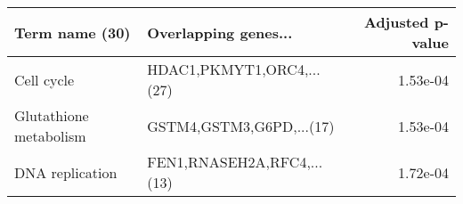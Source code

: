 \begin{tabular}{llr}
\toprule
        Term name (30) &       Overlapping genes... &  Adjusted p-value \\
\midrule
            Cell cycle &  HDAC1,PKMYT1,ORC4,...(27) &          1.53e-04 \\
Glutathione metabolism &   GSTM4,GSTM3,G6PD,...(17) &          1.53e-04 \\
       DNA replication & FEN1,RNASEH2A,RFC4,...(13) &          1.72e-04 \\
\bottomrule
\end{tabular}
